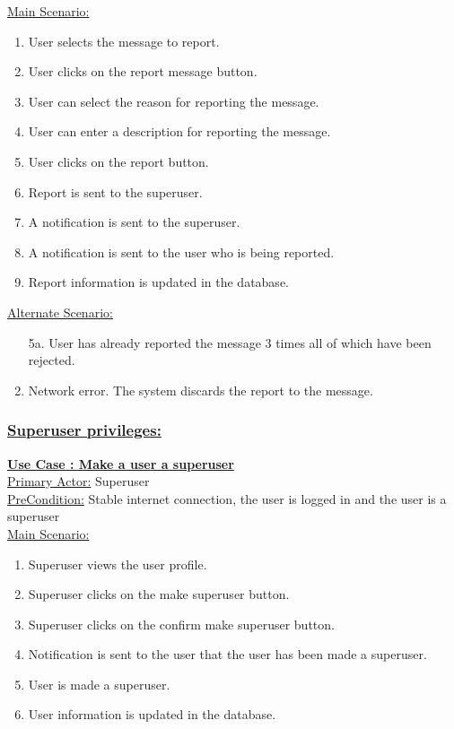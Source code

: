 \documentclass[conference,compsoc]{IEEEtran}
\newcounter{UC}
\newcommand{\nextU}{\stepcounter{UC}\theUC}
\begin{document}
\underline{Main Scenario:}\\
\begin{enumerate}
    \item User selects the message to report.
    \item User clicks on the report message button.
    \item User can select the reason for reporting the message.
    \item User can enter a description for reporting the message.
    \item User clicks on the report button.
    \item Report is sent to the superuser.
    \item A notification is sent to the superuser.
    \item A notification is sent to the user who is being reported.
    \item Report information is updated in the database.
\end{enumerate}

\underline{Alternate Scenario:}\\
\begin{enumerate}
    \item [5a.] User has already reported the message 3 times all of which have been rejected.
    \item Network error. The system discards the report to the message.
\end{enumerate}

\subsubsection{\underline{Superuser privileges:}}
\vspace{0.2cm}

\underline{\textbf{Use Case \nextU: Make a user a superuser}}\\

\underline{Primary Actor:} Superuser\\

\underline{PreCondition:} Stable internet connection, the user is logged in and the user is a superuser\\

\underline{Main Scenario:}\\
\begin{enumerate}
    \item Superuser views the user profile.
    \item Superuser clicks on the make superuser button.
    \item Superuser clicks on the confirm make superuser button.
    \item Notification is sent to the user that the user has been made a superuser.
    \item User is made a superuser.
    \item User information is updated in the database.
\end{enumerate}
\end{document}
